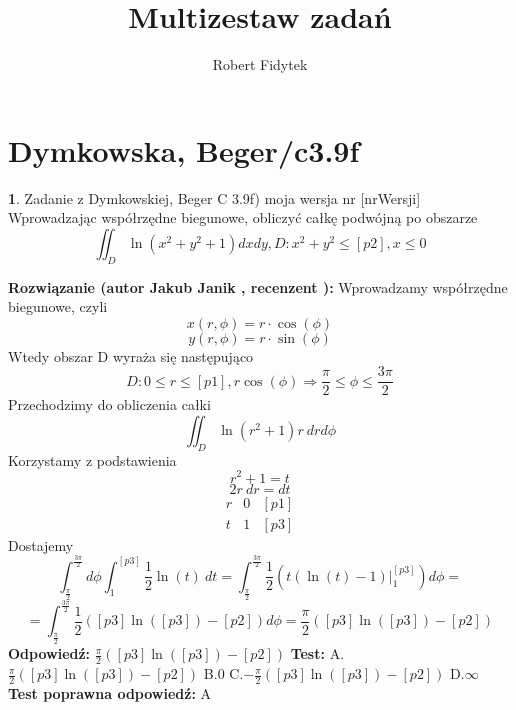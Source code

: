 \documentclass[12pt, a4paper]{article}
\title{Multizestaw zadań}
\author{Robert Fidytek}
\date{}
\theoremstyle{definition} %
\newtheorem{zad}{}
\newcommand{\kategoria}[1]{\section{#1}} %
\newcommand{\zadStart}[1]{\begin{zad}#1\newline} %
\newcommand{\zadStop}{\end{zad}}   %
\newcommand{\rozwStart}[2]{\noindent \textbf{Rozwiązanie (autor #1 , recenzent #2): }\newline} %
\newcommand{\rozwStop}{\newline}                                            %
\newcommand{\odpStart}{\noindent \textbf{Odpowiedź:}\newline}    %
\newcommand{\odpStop}{\newline}                                             %
\newcommand{\testStart}{\noindent \textbf{Test:}\newline} %
\newcommand{\testStop}{\newline} %
\newcommand{\kluczStart}{\noindent \textbf{Test poprawna odpowiedź:}\newline} %
\newcommand{\kluczStop}{\newline} %
\begin{document}
\maketitle


\kategoria{Dymkowska, Beger/c3.9f}
\zadStart{Zadanie z Dymkowskiej, Beger C 3.9f) moja wersja nr [nrWersji]}
Wprowadzając współrzędne biegunowe, obliczyć całkę podwójną po obszarze $$\iint_D \ln{(x^2+y^2+1)} dxdy, D: x^2+y^2 \leq [p2], x \leq 0$$
\zadStop
\rozwStart{Jakub Janik}{}
Wprowadzamy współrzędne biegunowe, czyli $$x(r,\phi)=r\cdot\cos{(\phi)}$$
$$y(r,\phi)=r\cdot\sin{(\phi)}$$
Wtedy obszar D wyraża się następująco $$D: 0 \leq r \leq [p1], r\cos{(\phi)} \Rightarrow \frac{\pi}{2} \leq \phi \leq \frac{3\pi}{2}$$
Przechodzimy do obliczenia całki
$$\iint_D \ln{(r^2+1)}r\ drd\phi$$
Korzystamy z podstawienia $$r^2+1=t$$ 
$$ 2r\ dr=dt$$
\begin{displaymath}
\left.\begin{array}{c|c|c}
r & 0 & [p1] \\ \hline
t & 1 & [p3]
\end{array}\right.
\end{displaymath}
Dostajemy
$$\int_{\frac{\pi}{2}}^{\frac{3\pi}{2}}d\phi\int_1^{[p3]}\frac{1}{2}\ln{(t)}\ dt=\int_{\frac{\pi}{2}}^{\frac{3\pi}{2}}\frac{1}{2}(t(\ln{(t)}-1)\Big|_1^{[p3]})d\phi=$$
$$=\int_{\frac{\pi}{2}}^{\frac{3\pi}{2}}\frac{1}{2}([p3]\ln{([p3])}-[p2])d\phi=\frac{\pi}{2}([p3]\ln{([p3])}-[p2])$$
\rozwStop
\odpStart
$\frac{\pi}{2}([p3]\ln{([p3])}-[p2])$
\odpStop
\testStart
A.$\frac{\pi}{2}([p3]\ln{([p3])}-[p2])$
B.$0$
C.$-\frac{\pi}{2}([p3]\ln{([p3])}-[p2])$
D.$\infty$
\testStop
\kluczStart
A
\kluczStop
\end{document}
